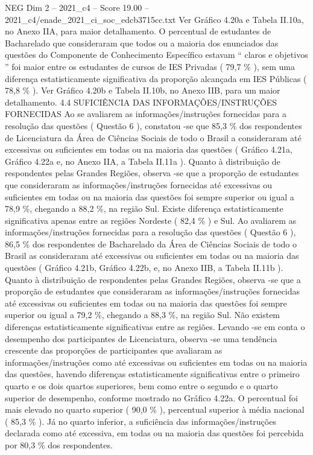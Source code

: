 \begin{textsample}{NEG Dim 2 – 2021\_c4 – Score 19.00 – 2021\_c4/enade\_2021\_ci\_soc\_edcb3715cc.txt}
Ver Gráfico 4.20a e Tabela II.10a, no Anexo IIA, para maior detalhamento.
O percentual de estudantes de Bacharelado que consideraram que todos ou a maioria dos enunciados das questões do Componente de Conhecimento Específico estavam “ claros e objetivos ” foi maior entre os estudantes de cursos de IES Privadas ( 79,7 \% ), sem uma diferença estatisticamente significativa da proporção alcançada em IES Públicas ( 78,8 \% ).
Ver Gráfico 4.20b e Tabela II.10b, no Anexo IIB, para um maior detalhamento. 4.4 SUFICIÊNCIA DAS INFORMAÇÕES/INSTRUÇÕES FORNECIDAS Ao se avaliarem as informações/instruções fornecidas para a resolução das questões ( Questão 6 ), constatou -se que 85,3 \% dos respondentes de Licenciatura da Área de Ciências Sociais de todo o Brasil a consideraram até excessivas ou suficientes em todas ou na maioria das questões ( Gráfico 4.21a, Gráfico 4.22a e, no Anexo IIA, a Tabela II.11a ).
Quanto à distribuição de respondentes pelas Grandes Regiões, observa -se que a proporção de estudantes que consideraram as informações/instruções fornecidas até excessivas ou suficientes em todas ou na maioria das questões foi sempre superior ou igual a 78,9 \%, chegando a 88,2 \%, na região Sul.
Existe diferença estatisticamente significativa apenas entre as regiões Nordeste ( 82,4 \% ) e Sul.
Ao avaliarem as informações/instruções fornecidas para a resolução das questões ( Questão 6 ), 86,5 \% dos respondentes de Bacharelado da Área de Ciências Sociais de todo o Brasil as consideraram até excessivas ou suficientes em todas ou na maioria das questões ( Gráfico 4.21b, Gráfico 4.22b, e, no Anexo IIB, a Tabela II.11b ).
Quanto à distribuição de respondentes pelas Grandes Regiões, observa -se que a proporção de estudantes que consideraram as informações/instruções fornecidas até excessivas ou suficientes em todas ou na maioria das questões foi sempre superior ou igual a 79,2 \%, chegando a 88,3 \%, na região Sul.
Não existem diferenças estatisticamente significativas entre as regiões.
Levando -se em conta o desempenho dos participantes de Licenciatura, observa -se uma tendência crescente das proporções de participantes que avaliaram as informações/instruções como até excessivas ou suficientes em todas ou na maioria das questões, havendo diferenças estatisticamente significativas entre o primeiro quarto e os dois quartos superiores, bem como entre o segundo e o quarto superior de desempenho, conforme mostrado no Gráfico 4.22a.
O percentual foi mais elevado no quarto superior ( 90,0 \% ), percentual superior à média nacional ( 85,3 \% ).
Já no quarto inferior, a suficiência das informações/instruções declarada como até excessiva, em todas ou na maioria das questões foi percebida por 80,3 \% dos respondentes.

\end{textsample}
